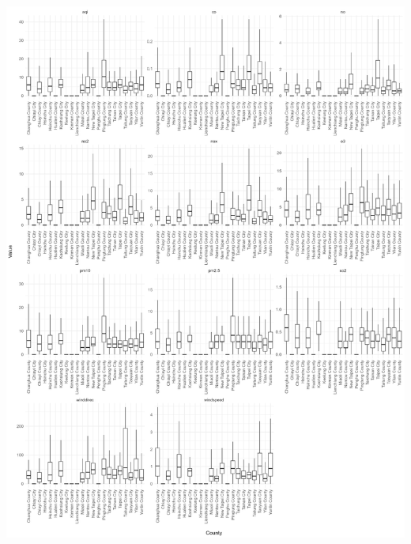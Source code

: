 \documentclass[./report.tex]{subfiles}
\begin{document}
\begin{enumerate}
  \includegraphics[width=\linewidth]{plots/question7/box-county.png}
\end{enumerate}
\end{document}
